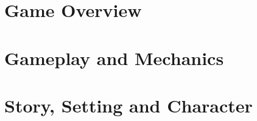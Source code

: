 \documentclass[12pt]{article}
\begin{document}


\tableofcontents 
\newpage

\newpage
\setcounter{page}{1}

\section{Game Overview}


\section{Gameplay and Mechanics}


\section{Story, Setting and Character}




% 
\end{document}
